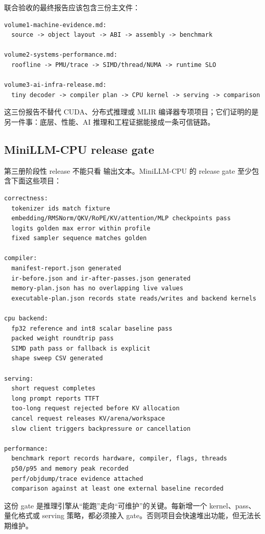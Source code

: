 联合验收的最终报告应该包含三份主文件：

\begin{lstlisting}[numbers=none,caption={三册联合出口报告}]
volume1-machine-evidence.md:
  source -> object layout -> ABI -> assembly -> benchmark

volume2-systems-performance.md:
  roofline -> PMU/trace -> SIMD/thread/NUMA -> runtime SLO

volume3-ai-infra-release.md:
  tiny decoder -> compiler plan -> CPU kernel -> serving -> comparison
\end{lstlisting}

这三份报告不替代 CUDA、分布式推理或 MLIR 编译器专项项目；它们证明的是另一件事：底层、性能、AI 推理和工程证据能接成一条可信链路。

\subsection{MiniLLM-CPU release gate}

第三册阶段性 release 不能只看  输出文本。MiniLLM-CPU 的 release gate 至少包含下面这些项目：

\begin{lstlisting}[numbers=none,caption={MiniLLM-CPU release gate}]
correctness:
  tokenizer ids match fixture
  embedding/RMSNorm/QKV/RoPE/KV/attention/MLP checkpoints pass
  logits golden max error within profile
  fixed sampler sequence matches golden

compiler:
  manifest-report.json generated
  ir-before.json and ir-after-passes.json generated
  memory-plan.json has no overlapping live values
  executable-plan.json records state reads/writes and backend kernels

cpu backend:
  fp32 reference and int8 scalar baseline pass
  packed weight roundtrip pass
  SIMD path pass or fallback is explicit
  shape sweep CSV generated

serving:
  short request completes
  long prompt reports TTFT
  too-long request rejected before KV allocation
  cancel request releases KV/arena/workspace
  slow client triggers backpressure or cancellation

performance:
  benchmark report records hardware, compiler, flags, threads
  p50/p95 and memory peak recorded
  perf/objdump/trace evidence attached
  comparison against at least one external baseline recorded
\end{lstlisting}

这份 gate 是推理引擎从“能跑”走向“可维护”的关键。每新增一个 kernel、pass、量化格式或 serving 策略，都必须接入 gate。否则项目会快速堆出功能，但无法长期维护。

